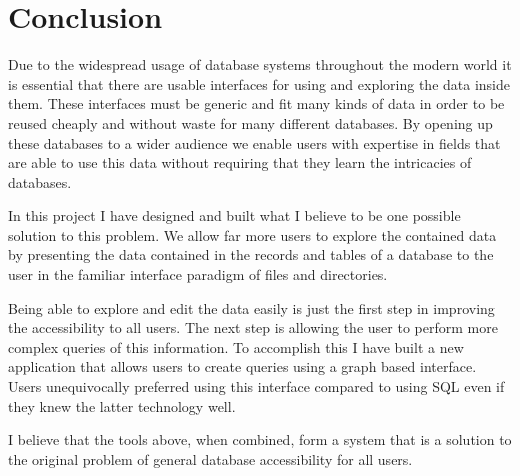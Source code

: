 \chapter{Conclusion}

Due to the widespread usage of database systems throughout the modern world it
is essential that there are usable interfaces for using and exploring the data
inside them. These interfaces must be generic and fit many kinds of data in
order to be reused cheaply and without waste for many different databases. By
opening up these databases to a wider audience we enable users with expertise
in fields that are able to use this data without requiring that they learn the
intricacies of databases.

In this project I have designed and built what I believe to be one possible
solution to this problem. We allow far more users to explore the contained data
by presenting the data contained in the records and tables of a database to the
user in the familiar interface paradigm of files and directories.

Being able to explore and edit the data easily is just the first step in
improving the accessibility to all users. The next step is allowing the user to
perform more complex queries of this information. To accomplish this I have
built a new application that allows users to create queries using a graph based
interface. Users unequivocally preferred using this interface compared to using
\ac{SQL} even if they knew the latter technology well.

I believe that the tools above, when combined, form a system that is a solution
to the original problem of general database accessibility for all users.
